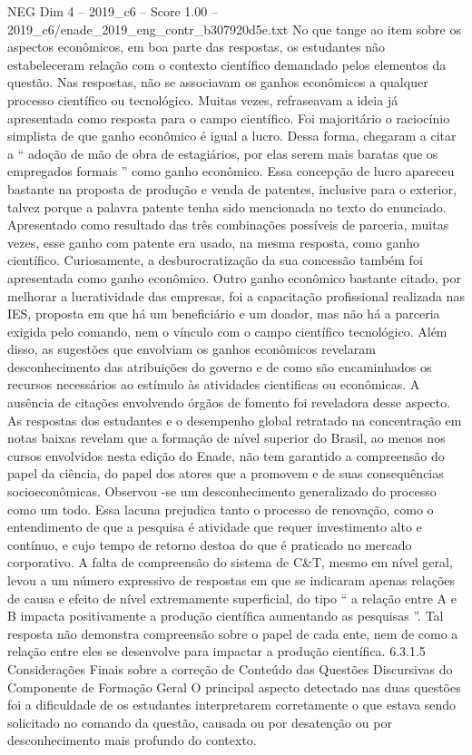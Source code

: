 \begin{textsample}{NEG Dim 4 – 2019\_c6 – Score 1.00 – 2019\_c6/enade\_2019\_eng\_contr\_b307920d5e.txt}
No que tange ao item sobre os aspectos econômicos, em boa parte das respostas, os estudantes não estabeleceram relação com o contexto científico demandado pelos elementos da questão.
Nas respostas, não se associavam os ganhos econômicos a qualquer processo científico ou tecnológico.
Muitas vezes, refraseavam a ideia já apresentada como resposta para o campo científico.
Foi majoritário o raciocínio simplista de que ganho econômico é igual a lucro.
Dessa forma, chegaram a citar a “ adoção de mão de obra de estagiários, por elas serem mais baratas que os empregados formais ” como ganho econômico.
Essa concepção de lucro apareceu bastante na proposta de produção e venda de patentes, inclusive para o exterior, talvez porque a palavra patente tenha sido mencionada no texto do enunciado.
Apresentado como resultado das três combinações possíveis de parceria, muitas vezes, esse ganho com patente era usado, na mesma resposta, como ganho científico.
Curiosamente, a desburocratização da sua concessão também foi apresentada como ganho econômico.
Outro ganho econômico bastante citado, por melhorar a lucratividade das empresas, foi a capacitação profissional realizada nas IES, proposta em que há um beneficiário e um doador, mas não há a parceria exigida pelo comando, nem o vínculo com o campo científico tecnológico.
Além disso, as sugestões que envolviam os ganhos econômicos revelaram desconhecimento das atribuições do governo e de como são encaminhados os recursos necessários ao estímulo às atividades cientificas ou econômicas.
A ausência de citações envolvendo órgãos de fomento foi reveladora desse aspecto.
As respostas dos estudantes e o desempenho global retratado na concentração em notas baixas revelam que a formação de nível superior do Brasil, ao menos nos cursos envolvidos nesta edição do Enade, não tem garantido a compreensão do papel da ciência, do papel dos atores que a promovem e de suas consequências socioeconômicas.
Observou -se um desconhecimento generalizado do processo como um todo.
Essa lacuna prejudica tanto o processo de renovação, como o entendimento de que a pesquisa é atividade que requer investimento alto e contínuo, e cujo tempo de retorno destoa do que é praticado no mercado corporativo.
A falta de compreensão do sistema de C\&T, mesmo em nível geral, levou a um número expressivo de respostas em que se indicaram apenas relações de causa e efeito de nível extremamente superficial, do tipo “ a relação entre A e B impacta positivamente a produção científica aumentando as pesquisas ”.
Tal resposta não demonstra compreensão sobre o papel de cada ente, nem de como a relação entre eles se desenvolve para impactar a produção científica. 6.3.1.5 Considerações Finais sobre a correção de Conteúdo das Questões Discursivas do Componente de Formação Geral O principal aspecto detectado nas duas questões foi a dificuldade de os estudantes interpretarem corretamente o que estava sendo solicitado no comando da questão, causada ou por desatenção ou por desconhecimento mais profundo do contexto.

\end{textsample}

